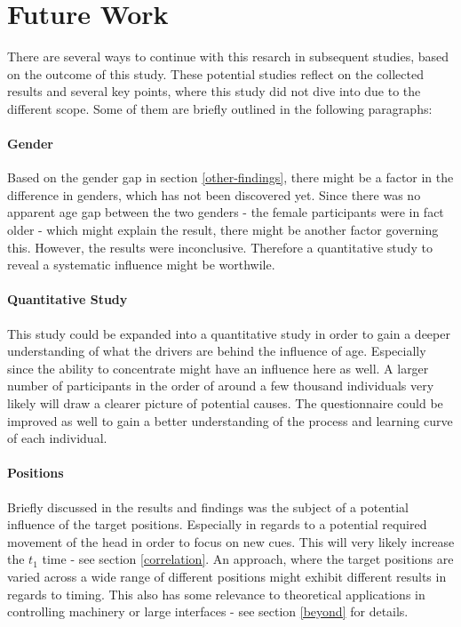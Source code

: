         \section{Future Work}

            There are several ways to continue with this resarch in subsequent studies, based on the outcome of this study. These potential studies reflect on the collected results and several key points, where this study did not dive into due to the different scope. Some of them are briefly outlined in the following paragraphs:

            \paragraph{Gender} Based on the gender gap in section \ref*{other-findings}, there might be a factor in the difference in genders, which has not been discovered yet. Since there was no apparent age gap between the two genders - the female participants were in fact older - which might explain the result, there might be another factor governing this. However, the results were inconclusive. Therefore a quantitative study to reveal a systematic influence might be worthwile. 

            \paragraph{Quantitative Study} This study could be expanded into a quantitative study in order to gain a deeper understanding of what the drivers are behind the influence of age. Especially since the ability to concentrate might have an influence here as well. A larger number of participants in the order of around a few thousand individuals very likely will draw a clearer picture of potential causes. The questionnaire could be improved as well to gain a better understanding of the process and learning curve of each individual. 

            \paragraph{Positions} Briefly discussed in the results and findings was the subject of a potential influence of the target positions. Especially in regards to a potential required movement of the head in order to focus on new cues. This will very likely increase the $t_{1}$ time - see section \ref*{correlation}. An approach, where the target positions are varied across a wide range of different positions might exhibit different results in regards to timing. This also has some relevance to theoretical applications in controlling machinery or large interfaces - see section \ref*{beyond} for details.

